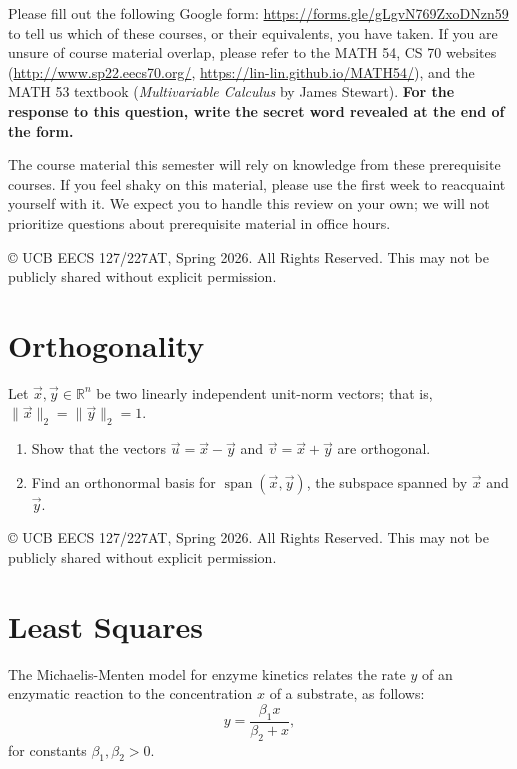 \documentclass[10pt]{article}
\theoremstyle{definition}
\theoremstyle{plain}
\newcommand{\RR}{\mathbb{R}}
\DeclareMathOperator{\spn}{span}
\begin{document}
Please fill out the following Google form: \url{https://forms.gle/gLgvN769ZxoDNzn59} to tell us which of these courses, or their equivalents, you have taken. If you are unsure of course material overlap, please refer to the MATH 54, CS 70 websites (\url{http://www.sp22.eecs70.org/}, \url{https://lin-lin.github.io/MATH54/}), and the MATH 53 textbook (\textit{Multivariable Calculus} by James Stewart). \textbf{For the response to this question, write the secret word revealed at the end of the form.}

The course material this semester will rely on knowledge from these prerequisite courses. If you feel shaky on this material, please use the first week to reacquaint yourself with it. We expect you to handle this review on your own; we will not prioritize questions about prerequisite material in office hours.

\vfill
\noindent\footnotesize{\copyright{} UCB EECS 127/227AT, Spring 2026. \scriptsize{All Rights Reserved. This may not be publicly shared without explicit permission.}}

\newpage

\section{Orthogonality}

Let $\vec{x}, \vec{y} \in \RR^n$ be two linearly independent unit-norm vectors; that is, $\|\vec{x}\|_2 = \|\vec{y}\|_2 = 1$.

\begin{enumerate}[label=(\alph*)]
    \item Show that the vectors $\vec{u} = \vec{x} - \vec{y}$ and $\vec{v} = \vec{x} + \vec{y}$ are orthogonal.
    \item Find an orthonormal basis for $\spn(\vec{x}, \vec{y})$, the subspace spanned by $\vec{x}$ and $\vec{y}$.
\end{enumerate}

\vfill
\noindent\footnotesize{\copyright{} UCB EECS 127/227AT, Spring 2026. \scriptsize{All Rights Reserved. This may not be publicly shared without explicit permission.}}

\newpage

\section{Least Squares}

The Michaelis-Menten model for enzyme kinetics relates the rate $y$ of an enzymatic reaction to the concentration $x$ of a substrate, as follows:
\begin{equation}
    y = \frac{\beta_1 x}{\beta_2 + x},
\end{equation}
for constants $\beta_1, \beta_2 > 0$.
\end{document}
